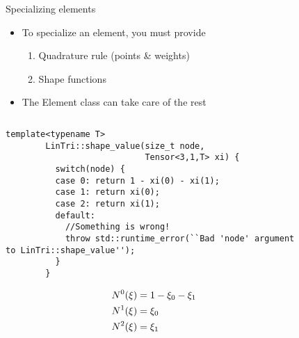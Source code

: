 \begin{frame}[fragile]{Specializing elements}
  \begin{itemize}
  \item
    To specialize an element, you must provide
    \begin{enumerate}
    \item Quadrature rule (points \& weights)
    \item Shape functions
    \end{enumerate}
  \item
    The Element class can take care of the rest
  \end{itemize}
  \begin{columns}
    \begin{column}{.6\textwidth}
      \begin{lstlisting}[basicstyle=\tiny\ttfamily]
        template<typename T>
        LinTri::shape_value(size_t node, 
                            Tensor<3,1,T> xi) {
          switch(node) {
          case 0: return 1 - xi(0) - xi(1);
          case 1: return xi(0);
          case 2: return xi(1);
          default:
            //Something is wrong!
            throw std::runtime_error(``Bad 'node' argument to LinTri::shape_value'');
          }
        }
      \end{lstlisting}
      \begin{align*}
        N^0(\mathbf{\xi}) &= 1 - \xi_0 - \xi_1 \\
        N^1(\mathbf{\xi}) &= \xi_0 \\
        N^2(\mathbf{\xi}) &= \xi_1 \\
      \end{align*}
    \end{column}
    \begin{column}{.4\textwidth}
      \begin{figure}
        \centering
      \end{figure}
    \end{column}
  \end{columns}
\end{frame}


